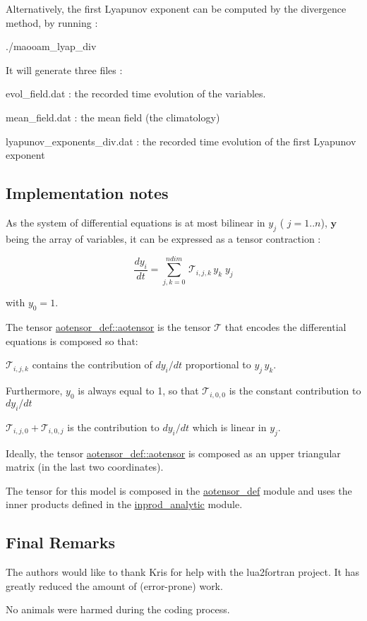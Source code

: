 Alternatively, the first Lyapunov exponent can be computed by the divergence method, by running \+:

./maooam\+\_\+lyap\+\_\+div

It will generate three files \+:
\begin{DoxyItemize}
\item evol\+\_\+field.\+dat \+: the recorded time evolution of the variables.
\item mean\+\_\+field.\+dat \+: the mean field (the climatology)
\item lyapunov\+\_\+exponents\+\_\+div.\+dat \+: the recorded time evolution of the first Lyapunov exponent 


\end{DoxyItemize}

\subsection*{Implementation notes}

As the system of differential equations is at most bilinear in $y_j$ ( $j=1..n$), $\boldsymbol{y}$ being the array of variables, it can be expressed as a tensor contraction \+:

\[ \frac{d y_i}{dt} = \sum_{j,k=0}^{ndim} \, \mathcal{T}_{i,j,k} \, y_k \; y_j \]

with $y_0 = 1$.

The tensor \hyperlink{namespaceaotensor__def_a0dc43bc9294a18f2fe57b67489f1702f}{aotensor\+\_\+def\+::aotensor} is the tensor $\mathcal{T}$ that encodes the differential equations is composed so that\+:


\begin{DoxyItemize}
\item $\mathcal{T}_{i,j,k}$ contains the contribution of $dy_i/dt$ proportional to $ y_j \, y_k$.
\item Furthermore, $y_0$ is always equal to 1, so that $\mathcal{T}_{i,0,0}$ is the constant contribution to $dy_i/dt$
\item $\mathcal{T}_{i,j,0} + \mathcal{T}_{i,0,j}$ is the contribution to $dy_i/dt$ which is linear in $y_j$.
\end{DoxyItemize}

Ideally, the tensor \hyperlink{namespaceaotensor__def_a0dc43bc9294a18f2fe57b67489f1702f}{aotensor\+\_\+def\+::aotensor} is composed as an upper triangular matrix (in the last two coordinates).

The tensor for this model is composed in the \hyperlink{namespaceaotensor__def}{aotensor\+\_\+def} module and uses the inner products defined in the \hyperlink{namespaceinprod__analytic}{inprod\+\_\+analytic} module.





\subsection*{Final Remarks}

The authors would like to thank Kris for help with the lua2fortran project. It has greatly reduced the amount of (error-\/prone) work.

No animals were harmed during the coding process. 